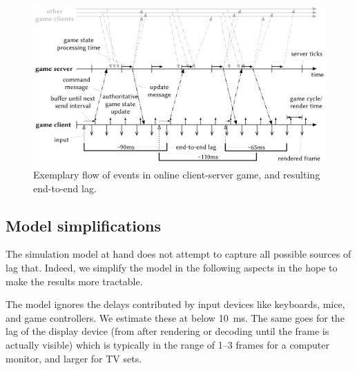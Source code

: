 \begin{figure}[!t]
	\centering
	\includegraphics[width=1.0\columnwidth]{../models/tickrate-timeseries.pdf}
	\caption{Exemplary flow of events in online client-server game, and resulting end-to-end lag. } %
\label{fig:tickrate-timeseries}
\end{figure}




\subsection{Model simplifications}

The simulation model at hand does not attempt to capture all possible 
sources of lag that. Indeed, we simplify the model in the 
following aspects in the hope to make the results more tractable.

The model ignores the delays contributed by 
input devices like keyboards, mice, and game controllers. We estimate 
these at below \SI{10}{\milli\second}. The same goes for the lag of 
the display device (from after rendering or decoding until the frame 
is actually visible) which is typically in the range of 1--3 frames for a computer 
monitor, and larger for TV sets. 

